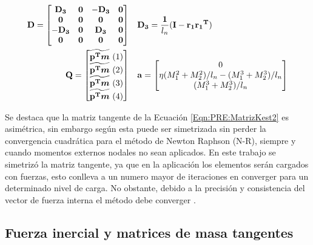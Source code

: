 \begin{eqnarray}
	\label{Eqn:PRE:DefD}
		\bf{D}=\begin{bmatrix}
		\bf{D_3}& \bf{0}   & -\bf{D_3}   & \bf{0} \\ 
		\bf{0}  & \bf{0} & \bf{0}   & \bf{0}\\ 
		-\bf{D_3}  & \bf{0}   & \bf{D_3} & \bf{0} \\ 
		\bf{0}  & \bf{0}   & \bf{0}   & \bf{0}
	\end{bmatrix}&~~~\bf{D_3}=\frac{1}{\text{$l_n$}}(\bf{I}-\bf{r_1}\bf{r_1}^T)\\
    \label{Eqn:PRE:DefQ}
	\bf{Q}=\begin{bmatrix}
		\widetilde{\bf{p}^T\boldsymbol{m}} ~(1)\\ 
		\widetilde{\bf{p}^T\boldsymbol{m}} ~(2)\\ 
		\widetilde{\bf{p}^T\boldsymbol{m}} ~(3)\\ 
		\widetilde{\bf{p}^T\boldsymbol{m}} ~(4)
	\end{bmatrix}&~~~\bf{a} =\begin{bmatrix}
	0\\ 
	\eta(M_1^2+M_2^2)/l_n-(M_1^3+M_2^3)/l_n\\ 
	(M_1^3+M_2^3)/l_n
\end{bmatrix}
\end{eqnarray}


Se destaca que la matriz tangente de la Ecuación  \eqref{Eqn:PRE:MatrizKest2} es asimétrica, sin embargo según \cite{Nour-Omid1991} esta puede ser simetrizada sin perder la convergencia cuadrática 
para el método de  Newton Raphson (N-R), siempre y cuando momentos externos nodales no sean aplicados. En este trabajo se simetrizó la matriz tangente, ya que en la aplicación los elementos serán cargados con fuerzas, esto conlleva a un numero mayor de iteraciones en converger para un determinado nivel de carga. No obstante, debido a la precisión y consistencia del vector de fuerza interna el método debe converger \cite{rankin1988use}. 

\subsection{Fuerza inercial y matrices de masa tangentes}\label{Sec:PRE:Inercial}

